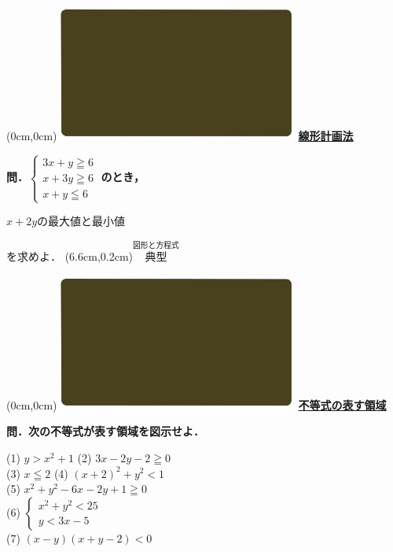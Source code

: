 \documentclass[10pt,
fleqn,
dvipdfmx,
uplatex
]{jsarticle}
\begin{document}
\newpage



\at(0cm,0cm){\includegraphics[width=8cm,bb=0 0 1920 1080]{./youtube/thumbnails/templates/smart_background/図形と方程式.jpeg}}
{\color{orange}\bf\boldmath\huge\underline{線形計画法}}\vspace{0.3zw}

\normalsize
\bf\boldmath 問．$\left\{\begin{array}{l}3x+y\geqq 6\;\\x+3y\geqq 6\;\\x+y\leqq 6\end{array}\right.$のとき，

\LARGE
\hspace{0.5zw}$x+2y$の最大値と最小値

\large
\hfill を求めよ．
\at(6.6cm,0.2cm){\small\color{bradorange}$\overset{\text{図形と方程式}}{\text{典型}}$}

\newpage

\at(0cm,0cm){\includegraphics[width=8cm,bb=0 0 1920 1080]{./youtube/thumbnails/templates/smart_background/図形と方程式.jpeg}}
{\color{orange}\bf\boldmath\LARGE\underline{不等式の表す領域}}\vspace{0.3zw}

\large 
\bf\boldmath 問．次の不等式が表す領域を図示せよ．

\small
(1)  $y>x^2+1$ \hspace{1zw} (2)  $3x-2y-2\geqq 0$\\
(3)  $x\leqq 2$  \hspace{4zw} (4)  $\left(x+2\right)^2+y^2<1$\\
(5)  $x^2+y^2-6x-2y+1\geqq 0$\vspace{0.1zw}\\
(6)  $\left\{\begin{array}{l}x^2+y^2<{25}\\y<3x-5\end{array}\right.$\\
(7)  $\left(x-y\right)\left(x+y-2\right)<0$\\
\end{document}
